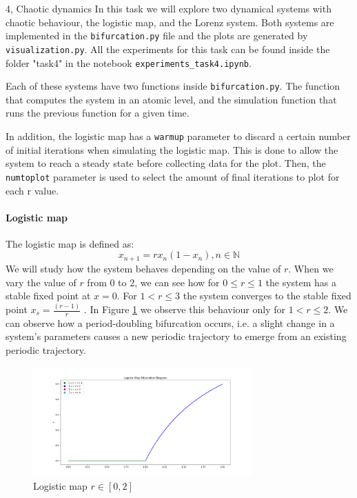 \begin{task}{4, Chaotic dynamics}
In this task we will explore two dynamical systems with chaotic behaviour, the logistic map, and the Lorenz system. Both systems are implemented in the \verb|bifurcation.py| file and the plots are generated by \verb|visualization.py|. All the experiments for this task can be found inside the folder "task4" in the notebook \verb|experiments_task4.ipynb|.

Each of these systems have two functions inside \verb|bifurcation.py|. The function that computes the system in an atomic level, and the simulation function that runs the previous function for a given time. 

In addition, the logistic map has a \verb|warmup| parameter to discard a certain number of initial iterations when simulating the logistic map. This is done to allow the system to reach a steady state before collecting data for the plot. Then, the \verb|numtoplot| parameter is used to select the amount of final iterations to plot for each r value.

\paragraph{Logistic map}
The logistic map is defined as:
\[
x_{n+1} = rx_n(1-x_n), n \in \mathbb{N}
\]
We will study how the system behaves depending on the value of \(r\).
When we vary the value of \(r\) from 0 to 2, we can see how for \(0 \le r \le 1\) the system has a stable fixed point at \(x = 0\). For \(1 < r \le 3\) the system converges to the stable fixed point \(x_s = \frac{(r-1)}{r}\) \cite{strogatz2018nonlinear}. In Figure \ref{r02}  we observe this behaviour only for \(1 < r \le 2\). We can observe how a period-doubling bifurcation occurs, i.e. a slight change in a system's parameters causes a new periodic trajectory to emerge from an existing periodic trajectory.
\begin{figure}[H]
    \centering
    \includegraphics[width=0.75\textwidth]{images/logistic_map_0_2.png}
    \caption{Logistic map \(r \in [0,2]\)}
    \label{r02}
\end{figure}


\end{task}
